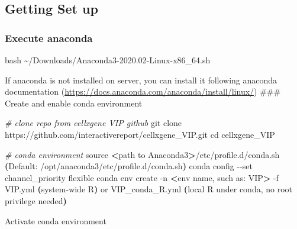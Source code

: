 \documentclass[
]{article}
\newenvironment{Shaded}{\begin{snugshade}}{\end{snugshade}}
\newcommand{\AttributeTok}[1]{\textcolor[rgb]{0.77,0.63,0.00}{#1}}
\newcommand{\BuiltInTok}[1]{#1}
\newcommand{\CommentTok}[1]{\textcolor[rgb]{0.56,0.35,0.01}{\textit{#1}}}
\newcommand{\ErrorTok}[1]{\textcolor[rgb]{0.64,0.00,0.00}{\textbf{#1}}}
\newcommand{\ExtensionTok}[1]{#1}
\newcommand{\FunctionTok}[1]{\textcolor[rgb]{0.00,0.00,0.00}{#1}}
\newcommand{\KeywordTok}[1]{\textcolor[rgb]{0.13,0.29,0.53}{\textbf{#1}}}
\newcommand{\NormalTok}[1]{#1}
\newcommand{\OperatorTok}[1]{\textcolor[rgb]{0.81,0.36,0.00}{\textbf{#1}}}
\newcommand{\VariableTok}[1]{\textcolor[rgb]{0.00,0.00,0.00}{#1}}
\begin{document}
\hypertarget{getting-set-up}{%
\subsection{Getting Set up}\label{getting-set-up}}

\hypertarget{execute-anaconda}{%
\subsubsection{Execute anaconda}\label{execute-anaconda}}

\begin{Shaded}
\begin{Highlighting}[]
\FunctionTok{bash}\NormalTok{ \textasciitilde{}/Downloads/Anaconda3{-}2020.02{-}Linux{-}x86\_64.sh}
\end{Highlighting}
\end{Shaded}

If anaconda is not installed on server, you can install it following anaconda documentation (\url{https://docs.anaconda.com/anaconda/install/linux/})
\#\#\# Create and enable conda environment

\begin{Shaded}
\begin{Highlighting}[]
\CommentTok{\# clone repo from cellxgene VIP github}
\FunctionTok{git}\NormalTok{ clone https://github.com/interactivereport/cellxgene\_VIP.git}
\BuiltInTok{cd}\NormalTok{ cellxgene\_VIP}

\CommentTok{\# conda environment}
\BuiltInTok{source} \OperatorTok{\textless{}}\NormalTok{path to Anaconda3}\OperatorTok{\textgreater{}}\NormalTok{/etc/profile.d/conda.sh }\ErrorTok{(}\ExtensionTok{Default:}\NormalTok{ /opt/anaconda3/etc/profile.d/conda.sh}\KeywordTok{)}
\ExtensionTok{conda}\NormalTok{ config }\AttributeTok{{-}{-}set}\NormalTok{ channel\_priority flexible}
\ExtensionTok{conda}\NormalTok{ env create }\AttributeTok{{-}n} \OperatorTok{\textless{}}\NormalTok{env name, such as: VIP}\OperatorTok{\textgreater{}}\NormalTok{ {-}f VIP.yml }\ErrorTok{(}\ExtensionTok{system{-}wide}\NormalTok{ R}\KeywordTok{)} \ExtensionTok{or}\NormalTok{ VIP\_conda\_R.yml }\ErrorTok{(}\BuiltInTok{local} \VariableTok{R} \VariableTok{under} \VariableTok{conda}\NormalTok{, }\VariableTok{no} \VariableTok{root} \VariableTok{privilege} \VariableTok{needed}\KeywordTok{)}
\end{Highlighting}
\end{Shaded}

Activate conda environment
\end{document}
